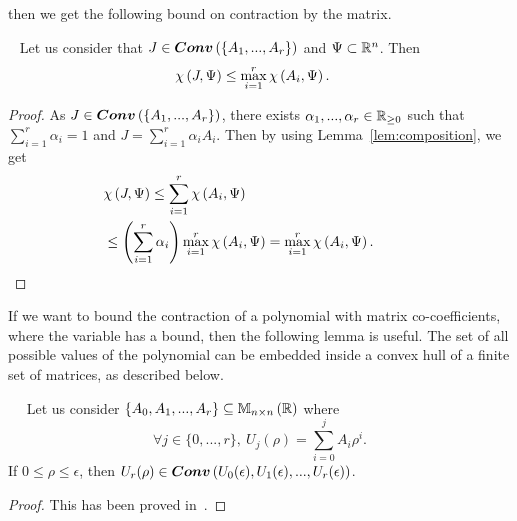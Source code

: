 then we get the following bound on contraction by the matrix.
%
\begin{lemma}~\label{lem:conv-bound}
Let us consider that $J\in\bm{Conv}\left(\left\{A_1,...,A_r\right\}\right)$ and
$\Psi\subset\mathbb{R}^n$.  Then
%
\begin{align*}
& \chi\left(J,\Psi\right)\leq\max_{i=1}^r\chi\left(A_i,\Psi\right).
\end{align*}
%
\end{lemma}
%
\begin{proof}
As $J\in\bm{Conv}\left(\left\{A_1,...,A_r\right\}\right)$, there exists
$\alpha_1,...,\alpha_r\in\mathbb{R}_{\geq 0}$ such that
$\sum_{i=1}^r\alpha_i=1$ and $J=\sum_{i=1}^r\alpha_iA_i$.  Then by
using Lemma~\ref{lem:composition}, we get
%
\begin{align*}
  & \chi\left(J,\Psi\right)\leq\sum_{i=1}^r\chi\left(A_i,\Psi\right)\\
  & \leq \left(\sum_{i=1}^r\alpha_i\right)\max_{i=1}^r\chi\left(A_i,\Psi\right)=\max_{i=1}^r\chi\left(A_i,\Psi\right).\hspace{3em}\qedhere
\end{align*}
%
\end{proof}
%
If we want to bound the contraction of a polynomial with matrix
co-coefficients, where the variable has a bound, then the following
lemma is useful.  The set of all possible values of
the polynomial can be embedded inside a convex hull of a finite set of
matrices, as described below.
%
\begin{lem}~\label{lem:convex}~\cite{2013hetel}
Let us consider $\left\{A_0,A_1,...,A_r\right\}\subseteq\mathbb{M}_{n\times n}\left(\mathbb{R}\right)$ where
%
\[
\forall j\in\{0,...,r\},~ U_j(\rho)=\sum_{i=0}^jA_i\rho^i.
\]
%
If
$0\leq\rho\leq \epsilon$, then $U_r(\rho)\in
\bm{Conv}\left(U_0(\epsilon),U_1(\epsilon),...,U_r(\epsilon)\right)$.
\end{lem}
\begin{proof}
This has been proved in~\cite{2013hetel}.
\end{proof}


